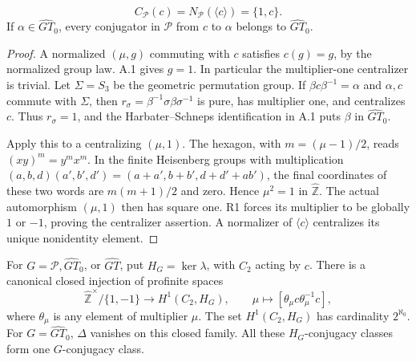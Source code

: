 \[
 C_{\mathcal P}(c)=N_{\mathcal P}(\langle c\rangle)=\{1,c\}.
\]
If \(\alpha\in\widehat{GT}_0\), every conjugator in
\(\mathcal P\) from \(c\) to \(\alpha\) belongs
to \(\widehat{GT}_0\).

\begin{proof}
A normalized \((\mu,g)\) commuting with \(c\) satisfies
\(c(g)=g\), by the normalized group law. A.1 gives
\(g=1\). In particular the multiplier-one centralizer
is trivial. Let \(\Sigma=S_3\) be the geometric
permutation group. If
\(\beta c\beta^{-1}=\alpha\) and \(\alpha,c\) commute
with \(\Sigma\), then
\(r_\sigma=\beta^{-1}\sigma\beta\sigma^{-1}\)
is pure, has multiplier one, and centralizes \(c\).
Thus \(r_\sigma=1\), and the Harbater--Schneps
identification in A.1 puts \(\beta\) in
\(\widehat{GT}_0\).

Apply this to a centralizing \((\mu,1)\).
The hexagon, with \(m=(\mu-1)/2\), reads
\((xy)^m=y^mx^m\). In the finite Heisenberg groups
with multiplication
\((a,b,d)(a',b',d')=(a+a',b+b',d+d'+ab')\),
the final coordinates of these two words are
\(m(m+1)/2\) and zero. Hence \(\mu^2=1\) in
\(\widehat{\mathbb Z}\). The actual automorphism
\((\mu,1)\) then has square one. R1 forces its
multiplier to be globally \(1\) or \(-1\), proving
the centralizer assertion. A normalizer of
\(\langle c\rangle\) centralizes its unique
nonidentity element.
\end{proof}

For \(G=\mathcal P,\widehat{GT}_0\), or \(\widehat{GT}\),
put \(H_G=\ker\lambda\), with \(C_2\) acting by \(c\).
There is a canonical closed injection of profinite spaces
\[
 \widehat{\mathbb Z}^{\times}/\{1,-1\}
 \longrightarrow H^1(C_2,H_G),\qquad
 \mu\longmapsto[\theta_\mu c\theta_\mu^{-1}c],
\]
where \(\theta_\mu\) is any element of multiplier \(\mu\).
The set \(H^1(C_2,H_G)\) has cardinality \(2^{\aleph_0}\).
For \(G=\widehat{GT}_0\), \(\Delta\) vanishes on this
closed family. All these \(H_G\)-conjugacy classes form
one \(G\)-conjugacy class.

